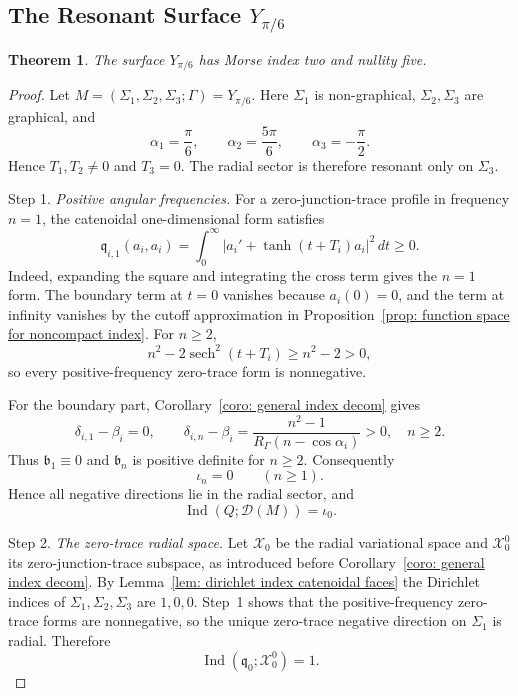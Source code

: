 \documentclass[11pt,twoside]{amsart}
\newtheorem{thm}{Theorem}[section]
\numberwithin{equation}{section}
\begin{document}
\subsection{The Resonant Surface \texorpdfstring{$Y_{\pi/6}$}{Y pi/6}}
\begin{thm}
The surface $Y_{\pi/6}$ has Morse index two and nullity five.
\end{thm}

\begin{proof}
Let $M=(\Sigma_1,\Sigma_2,\Sigma_3;\Gamma)=Y_{\pi/6}$. Here $\Sigma_1$ is non-graphical, $\Sigma_2,\Sigma_3$ are graphical, and
\[
\alpha_1=\frac{\pi}{6},\qquad
\alpha_2=\frac{5\pi}{6},\qquad
\alpha_3=-\frac{\pi}{2}.
\]
Hence $T_1,T_2\neq0$ and $T_3=0$. The radial sector is therefore resonant only on $\Sigma_3$.

\medskip
\noindent Step 1. \emph{Positive angular frequencies.}
For a zero-junction-trace profile in frequency $n=1$, the catenoidal one-dimensional form satisfies
\[
\mathfrak q_{i,1}(a_i,a_i)
=\int_0^\infty\left|a_i'+\tanh(t+T_i)a_i\right|^2\,dt\geq0.
\]
Indeed, expanding the square and integrating the cross term gives the $n=1$ form. The boundary term at $t=0$ vanishes because $a_i(0)=0$, and the term at infinity vanishes by the cutoff approximation in Proposition~\ref{prop: function space for noncompact index}. For $n\ge2$,
\[
n^2-2\operatorname{sech}^2(t+T_i)\ge n^2-2>0,
\]
so every positive-frequency zero-trace form is nonnegative.

For the boundary part, Corollary~\ref{coro: general index decom} gives
\[
\delta_{i,1}-\beta_i=0,
\qquad
\delta_{i,n}-\beta_i
=\frac{n^2-1}{R_\Gamma(n-\cos\alpha_i)}>0,
\quad n\ge2.
\]
Thus $\mathfrak b_1\equiv0$ and $\mathfrak b_n$ is positive definite for $n\ge2$. Consequently
\[
\iota_n=0\qquad(n\ge1).
\]
Hence all negative directions lie in the radial sector, and
\[
\operatorname{Ind}(Q;\mathcal D(M))=\iota_0.
\]

\medskip
\noindent Step 2. \emph{The zero-trace radial space.}
Let $\mathcal X_0$ be the radial variational space and $\mathcal X_0^0$ its zero-junction-trace subspace, as introduced before Corollary~\ref{coro: general index decom}. By Lemma~\ref{lem: dirichlet index catenoidal faces} the Dirichlet indices of $\Sigma_1,\Sigma_2,\Sigma_3$ are $1,0,0$. Step~1 shows that the positive-frequency zero-trace forms are nonnegative, so the unique zero-trace negative direction on $\Sigma_1$ is radial. Therefore
\[
\operatorname{Ind}(\mathfrak q_0;\mathcal X_0^0)=1.
\]


\end{proof}
\end{document}
